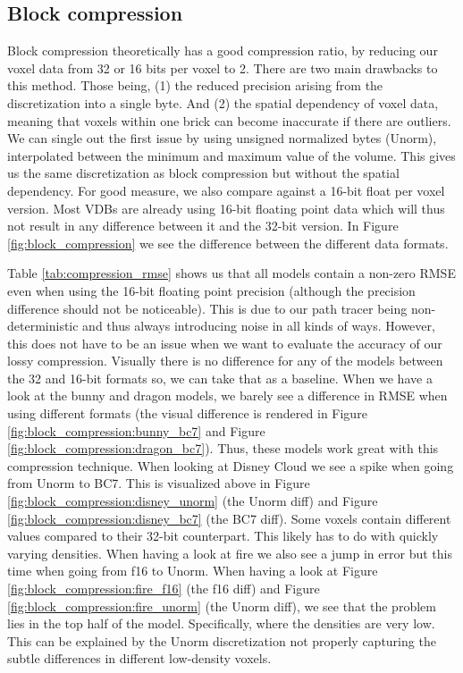 \subsection{Block compression} \label{results:block_compression}
Block compression theoretically has a good compression ratio, by reducing our voxel data from 32 or 16 bits per voxel to 2. There are two main drawbacks to this method. Those being, (1) the reduced precision arising from the discretization into a single byte. And (2) the spatial dependency of voxel data, meaning that voxels within one brick can become inaccurate if there are outliers. We can single out the first issue by using unsigned normalized bytes (Unorm), interpolated between the minimum and maximum value of the volume. This gives us the same discretization as block compression but without the spatial dependency. For good measure, we also compare against a 16-bit float per voxel version. Most VDBs are already using 16-bit floating point data which will thus not result in any difference between it and the 32-bit version. In Figure \ref{fig:block_compression} we see the difference between the different data formats.

Table \ref{tab:compression_rmse} shows us that all models contain a non-zero RMSE even when using the 16-bit floating point precision (although the precision difference should not be noticeable). This is due to our path tracer being non-deterministic and thus always introducing noise in all kinds of ways. However, this does not have to be an issue when we want to evaluate the accuracy of our lossy compression. Visually there is no difference for any of the models between the 32 and 16-bit formats so, we can take that as a baseline. When we have a look at the bunny and dragon models, we barely see a difference in RMSE when using different formats (the visual difference is rendered in Figure \ref{fig:block_compression:bunny_bc7} and Figure \ref{fig:block_compression:dragon_bc7}). Thus, these models work great with this compression technique. When looking at Disney Cloud we see a spike when going from Unorm to BC7. This is visualized above in Figure \ref{fig:block_compression:disney_unorm} (the Unorm diff) and Figure \ref{fig:block_compression:disney_bc7} (the BC7 diff). Some voxels contain different values compared to their 32-bit counterpart. This likely has to do with quickly varying densities. When having a look at fire we also see a jump in error but this time when going from f16 to Unorm. When having a look at Figure \ref{fig:block_compression:fire_f16} (the f16 diff) and Figure \ref{fig:block_compression:fire_unorm} (the Unorm diff), we see that the problem lies in the top half of the model. Specifically, where the densities are very low. This can be explained by the Unorm discretization not properly capturing the subtle differences in different low-density voxels.

